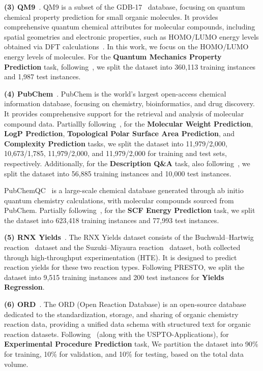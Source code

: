 \noindent\textbf{(3) QM9}~\cite{wu2018moleculenet}.
QM9 is a subset of the GDB-17~\cite{ruddigkeit2012enumeration} database, focusing on quantum chemical property prediction for small organic molecules. It provides comprehensive quantum chemical attributes for molecular compounds, including spatial geometries and electronic properties, such as HOMO/LUMO energy levels obtained via DFT calculations~\cite{kohn1965self}. In this work, we focus on the HOMO/LUMO energy levels of molecules. For the \textbf{Quantum Mechanics Property Prediction} task, following~\citet{fang2024molinstructions}, we split the dataset into 360,113 training instances and 1,987 test instances.

\noindent\textbf{(4) PubChem}~\cite{kim2021pubchem}.
PubChem is the world's largest open-access chemical information database, focusing on chemistry, bioinformatics, and drug discovery. It provides comprehensive support for the retrieval and analysis of molecular compound data. Partiallly following~\citet{li2024towards}, for the \textbf{Molecular Weight Prediction}, \textbf{LogP Prediction}, \textbf{Topological Polar Surface Area Prediction}, and \textbf{Complexity Prediction} tasks, we split the dataset into 11,979/2,000, 10,673/1,785, 11,979/2,000, and 11,979/2,000 for training and test sets, respectively. Additionally, for the \textbf{Description Q\&A} task, also following~\citet{li2024towards}, we split the dataset into 56,885 training instances and 10,000 test instances.

PubChemQC~\cite{maho2015pubchemqc} is a large-scale chemical database generated through ab initio quantum chemistry calculations, with molecular compounds sourced from PubChem. Partially following~\citet{li2024towards}, for the \textbf{SCF Energy Prediction} task, we split the dataset into 623,418 training instances and 77,993 test instances.

\noindent\textbf{(5) RNX Yields}~\cite{schwaller2021prediction}.
The RNX Yields dataset consists of the Buchwald–Hartwig reaction~\cite{ahneman2018predicting} dataset and the Suzuki–Miyaura reaction~\cite{perera2018platform} dataset, both collected through high-throughput experimentation (HTE). It is designed to predict reaction yields for these two reaction types. Following PRESTO, we split the dataset into 9,515 training instances and 200 test instances for \textbf{Yields Regression}.


\noindent\textbf{(6) ORD}~\cite{kearnes2021open}.
The ORD (Open Reaction Database) is an open-source database dedicated to the standardization, storage, and sharing of organic chemistry reaction data, providing a unified data schema with structured text for organic reaction datasets. Following~\citet{liu2024reactxt} (along with the USPTO-Applications), for \textbf{Experimental Procedure Prediction} task, We partition the dataset into 90\% for training, 10\% for validation, and 10\% for testing, based on the total data volume.


